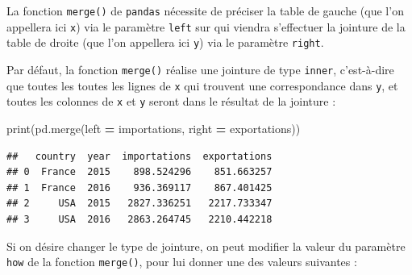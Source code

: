 \documentclass[12pt,]{book}
\newenvironment{Shaded}{\begin{snugshade}}{\end{snugshade}}
\newcommand{\OperatorTok}[1]{\textcolor[rgb]{0.81,0.36,0.00}{\textbf{#1}}}
\newcommand{\BuiltInTok}[1]{#1}
\newcommand{\NormalTok}[1]{#1}
\numberwithin{equation}{section}
\numberwithin{countremarque}{section}
\begin{document}
La fonction \texttt{merge()} de \texttt{pandas} nécessite de préciser la
table de gauche (que l'on appellera ici \texttt{x}) via le paramètre
\texttt{left} sur qui viendra s'effectuer la jointure de la table de
droite (que l'on appellera ici \texttt{y}) via le paramètre
\texttt{right}.

Par défaut, la fonction \texttt{merge()} réalise une jointure de type
\texttt{inner}, c'est-à-dire que toutes les toutes les lignes de
\texttt{x} qui trouvent une correspondance dans \texttt{y}, et toutes
les colonnes de \texttt{x} et \texttt{y} seront dans le résultat de la
jointure :

\begin{Shaded}
\begin{Highlighting}[]
\BuiltInTok{print}\NormalTok{(pd.merge(left }\OperatorTok{=}\NormalTok{ importations, right }\OperatorTok{=}\NormalTok{ exportations))}
\end{Highlighting}
\end{Shaded}

\begin{lstlisting}
##   country  year  importations  exportations
## 0  France  2015    898.524296    851.663257
## 1  France  2016    936.369117    867.401425
## 2     USA  2015   2827.336251   2217.733347
## 3     USA  2016   2863.264745   2210.442218
\end{lstlisting}

Si on désire changer le type de jointure, on peut modifier la valeur du
paramètre \texttt{how} de la fonction \texttt{merge()}, pour lui donner
une des valeurs suivantes :
\end{document}

